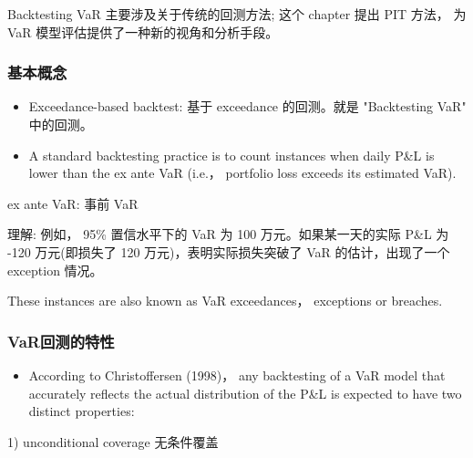 Backtesting VaR 主要涉及关于传统的回测方法; 这个 chapter 提出 PIT 方法， 为 VaR 模型评估提供了一种新的视角和分析手段。


\subsubsection{基本概念}


\begin{itemize}
    \item Exceedance-based backtest: 基于 exceedance 的回测。就是 "Backtesting VaR" 中的回测。
    \end{itemize}
    
    \begin{itemize}
    \item A standard backtesting practice is to count instances when daily P\&L is lower than the ex ante VaR (i.e.， portfolio loss exceeds its estimated VaR).
    \end{itemize}
    
     ex ante VaR: 事前 VaR
    
     理解: 例如， 95\% 置信水平下的 VaR 为 100 万元。如果某一天的实际 P\&L 为 -120 万元(即损失了 120 万元)，表明实际损失突破了 VaR 的估计，出现了一个 exception 情况。
    
     These instances are also known as VaR exceedances， exceptions or breaches.
    

\subsubsection{VaR回测的特性}


\begin{itemize}
    \item According to Christoffersen (1998)， any backtesting of a VaR model that accurately reflects the actual distribution of the P\&L is expected to have two distinct properties:
    \end{itemize}
    
    1) unconditional coverage 无条件覆盖
    
